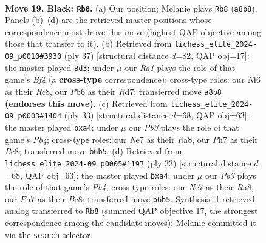 \documentclass[11pt]{article}
\begin{document}
\clearpage

\begin{figure}[p]\centering
\begin{subfigure}{0.46\textwidth}\centering
\resizebox{\linewidth}{!}{%
\newchessgame
\chessboard[
  setfen={r1b2rk1/p3np1p/1p2pnp1/2P5/2P5/4PB2/P1N2PPP/1RB1R1K1 b - - 1 19},
  showmover=false,
  pgfstyle=straightmove, color=movearrow, markmove={a8-b8}
]}
\caption{}
\end{subfigure}\hfill
\begin{subfigure}{0.46\textwidth}\centering
\resizebox{\linewidth}{!}{%
\newchessgame
\chessboard[
  setfen={2r3k1/p2rn1pp/2pBpp2/p1P2b2/R6N/2P5/PP3PPP/2R3K1 b - - 5 19},
  showmover=false,
  pgfstyle=straightmove, color=movearrow, markmove={f5-d3}
]}
\caption{}
\end{subfigure}
\\[4pt]
\begin{subfigure}{0.46\textwidth}\centering
\resizebox{\linewidth}{!}{%
\newchessgame
\chessboard[
  setfen={r1b2rk1/5ppp/p3pn2/1pb5/P7/3BPN2/1P3PPP/R1BR2K1 b - - 0 17},
  showmover=false,
  pgfstyle=straightmove, color=movearrow, markmove={b5-a4}
]}
\caption{}
\end{subfigure}\hfill
\begin{subfigure}{0.46\textwidth}\centering
\resizebox{\linewidth}{!}{%
\newchessgame
\chessboard[
  setfen={r1b2rk1/5ppp/p3pn2/1pb5/P7/3BPN2/1P3PPP/R1BR2K1 b - - 0 17},
  showmover=false,
  pgfstyle=straightmove, color=movearrow, markmove={b5-a4}
]}
\caption{}
\end{subfigure}
\caption{\textbf{Move 19, Black: \texttt{Rb8}.} (a) Our position; Melanie plays \texttt{Rb8} (\texttt{a8b8}). Panels (b)--(d) are the retrieved master positions whose correspondence most drove this move (highest QAP objective among those that transfer to it). (b) Retrieved from \texttt{lichess\_elite\_2024-09\_p0010\#3930} (ply 37) [structural distance $d$=82, QAP obj=17]: the master played \texttt{Bd3}; under $\mu$ our \emph{Ra1} plays the role of that game's \emph{Bf4} (a \textbf{cross-type} correspondence); cross-type roles: our \emph{N}f6 as their \emph{R}c8, our \emph{P}b6 as their \emph{R}d7; transferred move \texttt{a8b8} \textbf{(endorses this move)}. (c) Retrieved from \texttt{lichess\_elite\_2024-09\_p0003\#1404} (ply 33) [structural distance $d$=68, QAP obj=63]: the master played \texttt{bxa4}; under $\mu$ our \emph{Pb3} plays the role of that game's \emph{Pb4}; cross-type roles: our \emph{N}e7 as their \emph{R}a8, our \emph{P}h7 as their \emph{B}c8; transferred move \texttt{b6b5}. (d) Retrieved from \texttt{lichess\_elite\_2024-09\_p0005\#1197} (ply 33) [structural distance $d$=68, QAP obj=63]: the master played \texttt{bxa4}; under $\mu$ our \emph{Pb3} plays the role of that game's \emph{Pb4}; cross-type roles: our \emph{N}e7 as their \emph{R}a8, our \emph{P}h7 as their \emph{B}c8; transferred move \texttt{b6b5}. Synthesis: 1 retrieved analog transferred to \texttt{Rb8} (summed QAP objective 17, the strongest correspondence among the candidate moves); Melanie committed it via the \texttt{search} selector.}
\label{fig:thought-m37}
\end{figure}
\end{document}
